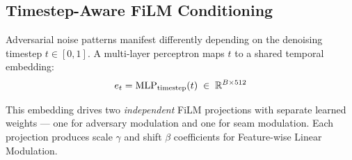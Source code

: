 \subsection{Timestep-Aware FiLM Conditioning}

Adversarial noise patterns manifest differently depending on the denoising
timestep $t \in [0,1]$.  A multi-layer perceptron maps $t$ to a shared
temporal embedding:
\begin{equation}
    e_{t} = \operatorname{MLP}_{\text{timestep}}(t)
    \;\in\; \mathbb{R}^{B \times 512} \notag
\end{equation}

This embedding drives two \emph{independent} FiLM projections with separate
learned weights --- one for adversary modulation and one for seam modulation.
Each projection produces scale $\gamma$ and shift $\beta$ coefficients for
Feature-wise Linear Modulation.

